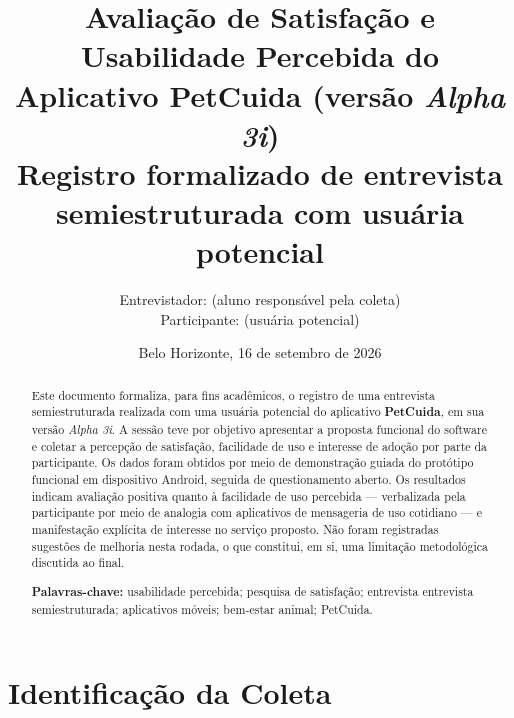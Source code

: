\documentclass[12pt,a4paper]{article}
\title{\textbf{Avaliação de Satisfação e Usabilidade Percebida do\\
Aplicativo PetCuida (versão \textit{Alpha 3i})}\\[0.4cm]
\large Registro formalizado de entrevista semiestruturada com usuária potencial}
\author{Entrevistador: \entrevistador{} (aluno responsável pela coleta)\\
Participante: \participante{} (usuária potencial)}
\date{Belo Horizonte, 16 de setembro de 2026}
\begin{document}
\maketitle
\thispagestyle{empty}

\begin{abstract}
\noindent Este documento formaliza, para fins acadêmicos, o registro de uma entrevista
semiestruturada realizada com uma usuária potencial do aplicativo \textbf{PetCuida}, em sua
versão \textit{Alpha 3i}. A sessão teve por objetivo apresentar a proposta funcional do
software e coletar a percepção de satisfação, facilidade de uso e interesse de adoção por
parte da participante. Os dados foram obtidos por meio de demonstração guiada do protótipo
funcional em dispositivo Android, seguida de questionamento aberto. Os resultados indicam
avaliação positiva quanto à facilidade de uso percebida --- verbalizada pela participante por
meio de analogia com aplicativos de mensageria de uso cotidiano --- e manifestação explícita
de interesse no serviço proposto. Não foram registradas sugestões de melhoria nesta rodada,
o que constitui, em si, uma limitação metodológica discutida ao final.

\vspace{0.4cm}
\noindent\textbf{Palavras-chave:} usabilidade percebida; pesquisa de satisfação; entrevista
entrevista semiestruturada; aplicativos móveis; bem-estar animal; PetCuida.
\end{abstract}

\newpage
\tableofcontents
\newpage

\section{Identificação da Coleta}
\end{document}
